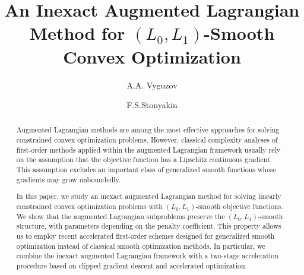\documentclass[runningheads]{llncs}
\begin{document}
	
	\title{An Inexact Augmented Lagrangian Method for $(L_0,L_1)$-Smooth Convex Optimization}
	
	\author{
		A.A. Vyguzov 
		\and
		F.\;S.\;Stonyakin
	}
	
	
	
	\maketitle
	
	\begin{abstract}
		Augmented Lagrangian methods are among the most effective approaches for solving constrained convex optimization problems. However, classical complexity analyses of first-order methods applied within the augmented Lagrangian framework usually rely on the assumption that the objective function has a Lipschitz continuous gradient. This assumption excludes an important class of generalized smooth functions whose gradients may grow unboundedly.
		
		In this paper, we study an inexact augmented Lagrangian method for solving linearly constrained convex optimization problems with $(L_0,L_1)$-smooth objective functions. We show that the augmented Lagrangian subproblems preserve the $(L_0,L_1)$-smooth structure, with parameters depending on the penalty coefficient. This property allows us to employ recent accelerated first-order schemes designed for generalized smooth optimization instead of classical smooth optimization methods. In particular, we combine the inexact augmented Lagrangian framework with a two-stage acceleration procedure based on clipped gradient descent and accelerated optimization.
		
	\end{abstract}
	
\end{document}

